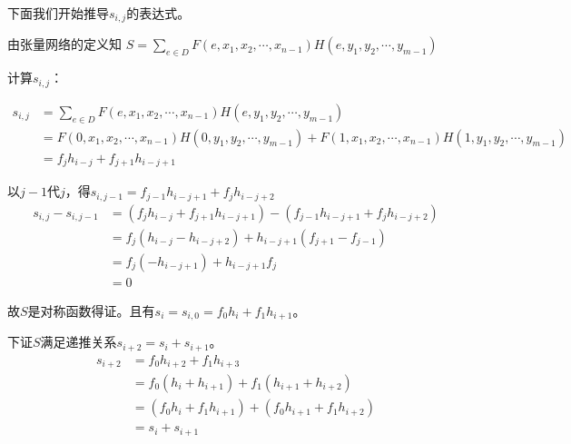 \documentclass{article}
\begin{document}
下面我们开始推导$s_{i,j}$的表达式。

由张量网络的定义知 $S=\sum_{e\in D}F(e,x_1,x_2,\cdots,x_{n-1})H(e,y_1,y_2,\cdots, y_{m-1})$

计算$s_{i,j}$：

\begin{equation*}
\begin{split}
s_{i,j} &= \sum_{e\in D}F(e,x_1,x_2,\cdots,x_{n-1})H(e,y_1,y_2,\cdots, y_{m-1}) \\
&= F(0,x_1,x_2,\cdots,x_{n-1})H(0,y_1,y_2,\cdots, y_{m-1})+F(1,x_1,x_2,\cdots,x_{n-1})H(1,y_1,y_2,\cdots, y_{m-1})\\
&=f_jh_{i-j} + f_{j+1}h_{i-j+1}
\end{split}
\end{equation*}

以$j-1$代$j$，得$s_{i,j-1}=f_{j-1}h_{i-j+1} + f_{j}h_{i-j+2}$
\begin{equation*}
\begin{split}
s_{i,j}-s_{i,j-1} &= (f_jh_{i-j} + f_{j+1}h_{i-j+1}) - (f_{j-1}h_{i-j+1} + f_{j}h_{i-j+2})\\ & = f_j(h_{i-j} - h_{i-j+2}) + h_{i-j+1}(f_{j+1} -f_{j-1})\\
&= f_j(-h_{i-j+1}) + h_{i-j+1}f_j\\
&= 0
\end{split}
\end{equation*}

故$S$是对称函数得证。且有$s_i = s_{i,0} = f_0h_i + f_1h_{i+1}$。

下证$S$满足递推关系$s_{i+2}=s_{i} + s_{i+1}$。
\begin{equation*}
\begin{split}
s_{i+2} &= f_0h_{i+2} + f_1h_{i+3}\\
&=f_0(h_{i}  + h_{i+1}) + f_1(h_{i+1} + h_{i+2})\\
&=(f_0h_i + f_1h_{i+1}) + (f_0h_{i+1} + f_1h_{i+2})\\
&=s_{i} + s_{i+1}
\end{split}
\end{equation*}
\end{document}
